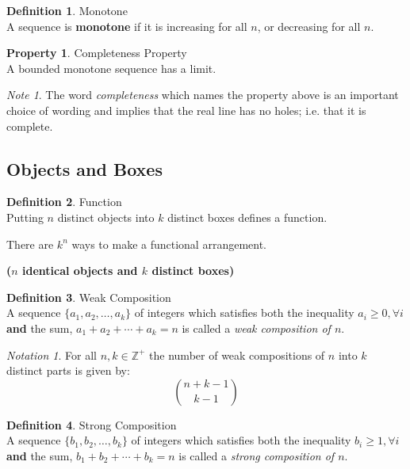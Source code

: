 \documentclass[10pt,a4paper,titlepage,twoside,draft]{article}
\theoremstyle{plain}
\theoremstyle{definition}
\newtheorem{defn}{Definition}
\newtheorem{prot}{Property}
\theoremstyle{remark}
\newtheorem{nt}{Note}
\newtheorem{nota}{Notation}
\begin{document}
\bigskip

\begin{defn}{Monotone} \\
A sequence is \textbf{monotone} if it is increasing for all $n$, or decreasing for all $n$. 
\end{defn}

\bigskip

\begin{prot}{Completeness Property} \\
A bounded monotone sequence has a limit.
\end{prot}

\begin{nt}
The word \emph{completeness} which names the property above is an important choice of wording and implies that the real line has no holes; 
i.e. that it is complete.
\end{nt}


\subsection{Objects and Boxes}

\begin{defn}{Function} \\
Putting $n$ distinct objects into $k$ distinct boxes defines a function.

There are $k^{n}$ ways to make a functional arrangement.
\end{defn}

\bigskip

\textbf{($n$ identical objects and $k$ distinct boxes)} \\

\begin{defn}{Weak Composition} \\
A sequence $\{a_{1},a_{2},\ldots,a_{k}\}$ of integers which satisfies both the inequality $a_{i} \geq 0, \forall i$ \textbf{and} the sum, $a_{1} + a_{2} + \cdots + a_{k} = n$ is called a \emph{weak composition of $n$}.
\end{defn}

\medskip

\begin{nota}
For all $n,k \in \mathbb{Z}^{+}$ the number of weak compositions of $n$ into $k$ distinct parts is given by: 
\[ \binom{n+k-1}{k-1} \]
\end{nota}

\medskip

\begin{defn}{Strong Composition} \\
A sequence $\{b_{1},b_{2},\ldots,b_{k}\}$ of integers which satisfies both the inequality $b_{i} \geq 1, \forall i$ \textbf{and} the sum, $b_{1} + b_{2} + \cdots + b_{k} = n$ is called a \emph{strong composition of $n$}.
\end{defn}
\end{document}
